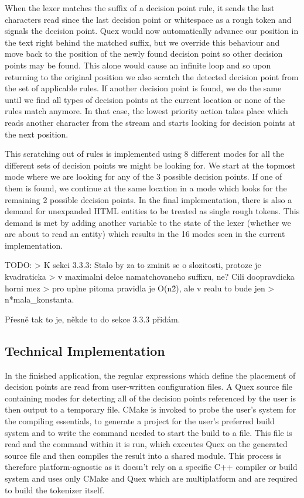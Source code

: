 When the lexer matches the suffix of a decision point rule, it sends the last
characters read since the last decision point or whitespace as a rough token
and signals the decision point. Quex would now automatically advance our
position in the text right behind the matched suffix, but we override this
behaviour and move back to the position of the newly found decision point so
other decision points may be found. This alone would cause an infinite loop and
so upon returning to the original position we also scratch the detected
decision point from the set of applicable rules. If another decision point is
found, we do the same until we find all types of decision points at the current
location or none of the rules match anymore. In that case, the lowest priority
action takes place which reads another character from the stream and starts
looking for decision points at the next position.

This scratching out of rules is implemented using 8 different modes for all the
different sets of decision points we might be looking for. We start at the
topmost mode where we are looking for any of the 3 possible decision points. If
one of them is found, we continue at the same location in a mode which looks
for the remaining 2 possible decision points. In the final implementation,
there is also a demand for unexpanded HTML entities to be treated as single
rough tokens. This demand is met by adding another variable to the state of
the lexer (whether we are about to read an entity) which results in the 16
modes seen in the current implementation.

TODO: > K sekci 3.3.3: Stalo by za to zminit se o slozitosti, protoze je
kvadraticka
> v maximalni delce namatchovaneho suffixu, ne? Cili doopravdicka horni mez
> pro uplne pitoma pravidla je O(n\^2), ale v realu to bude jen
> n*mala\_konstanta.

Přesně tak to je, někde to do sekce 3.3.3 přidám.

\subsection{Technical Implementation}
\label{ssec:impl-roughtok-technical}

In the finished application, the regular expressions which define the placement
of decision points are read from user-written configuration files. A Quex
source file containing modes for detecting all of the decision points
referenced by the user is then output to a temporary file. CMake
\cite{web-cmake} is invoked to probe the user's system for the compiling
essentials, to generate a project for the user's preferred build system and to
write the command needed to start the build to a file. This file is read and
the command within it is run, which executes Quex on the generated source file
and then compiles the result into a shared module. This process is therefore
platform-agnostic as it doesn't rely on a specific C++ compiler or build system
and uses only CMake and Quex which are multiplatform and are required to build
the tokenizer itself.

